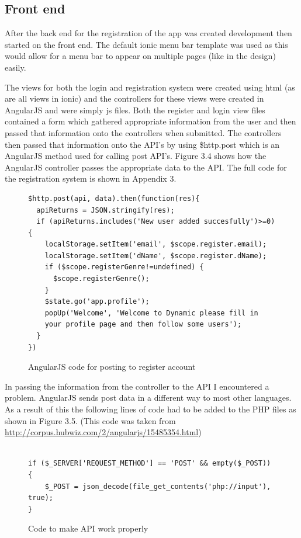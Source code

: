 \subsection{Front end}
After the back end for the registration of the app was created development then started on the front end. The default ionic menu bar template was used as this would allow for a menu bar to appear on multiple pages (like in the design) easily.

The views for both the login and registration system were created using html (as are all views in ionic) and the controllers for these views were created in AngularJS and were simply js files. Both the register and login view files contained a form which gathered appropriate information from the user and then passed that information onto the controllers when submitted. The controllers then passed that information onto the API's by using \$http.post which is an AngularJS method used for calling post API's. Figure 3.4 shows how the AngularJS controller passes the appropriate data to the API. The full code for the registration system is shown in Appendix 3.
\begin{center}
\begin{figure}[H]
\begin{verbatim}
$http.post(api, data).then(function(res){
  apiReturns = JSON.stringify(res);
  if (apiReturns.includes('New user added succesfully')>=0) {
    localStorage.setItem('email', $scope.register.email);
    localStorage.setItem('dName', $scope.register.dName);
    if ($scope.registerGenre!=undefined) {
      $scope.registerGenre();
    }
    $state.go('app.profile');
    popUp('Welcome', 'Welcome to Dynamic please fill in 
    your profile page and then follow some users');
  }
})
\end{verbatim}
\caption{AngularJS code for posting to register account}
\end{figure}
\end{center}

In passing the information from the controller to the API I encountered a problem. AngularJS sends post data in a different way to most other languages. As a result of this the following lines of code had to be added to the PHP files as shown in Figure 3.5. (This code was taken from \url{http://corpus.hubwiz.com/2/angularjs/15485354.html})
\begin{center} 
\begin{figure}[H]
\begin{verbatim}

if ($_SERVER['REQUEST_METHOD'] == 'POST' && empty($_POST)) {
    $_POST = json_decode(file_get_contents('php://input'), true);
}
\end{verbatim}
\caption{Code to make API work properly}
\end{figure}
\end{center}

